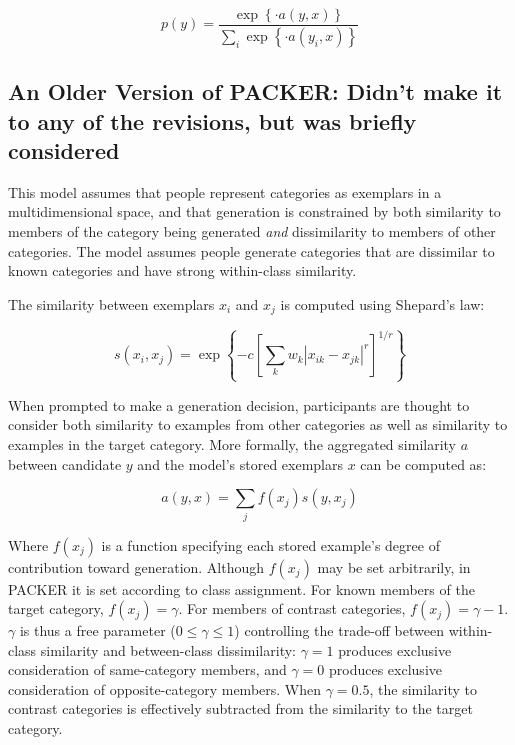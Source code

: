 \documentclass[12pt]{article} \usepackage[letterpaper, margin=1in,
\begin{document}
\begin{equation} p(y) = \dfrac { \exp \left \{ \cdot a \left( y, x
\right) \right \} } { \sum_i{ \exp \left \{  \cdot a \left( y_i, x \right)
\right\} } }
\label{eq:packer-choice}
\end{equation}




\subsection{An Older Version of PACKER: Didn't make it to any of the revisions, but was briefly considered}
This model assumes that people represent categories as exemplars in a
multidimensional space, and that generation is constrained by both similarity to
members of the category being generated \textit{and} dissimilarity to members of
other categories. The model assumes people generate categories that are
dissimilar to known categories and have strong within-class similarity.

The similarity between exemplars $x_i$ and $x_j$ is computed using Shepard's
law:

\begin{equation} s\left(x_i,x_j\right) = \exp \left\{ -c \left[\sum_{k}{ w_k
\left| x_{ik} - x_{jk} \right|^r }\right]^{1/r} \right\}
\label{eq:similarity}
\end{equation}

When prompted to make a generation decision, participants are thought to
consider both similarity to examples from other categories as well as similarity
to examples in the target category. More formally, the aggregated similarity $a$
between candidate $y$ and the model's stored exemplars $x$ can be computed as:

\begin{equation} a(y, x) = \sum_j{f(x_j) s(y, x_j)}
\end{equation}

Where $f(x_j)$ is a function specifying each stored example's degree of
contribution toward generation. Although $f(x_j)$ may be set arbitrarily, in
PACKER it is set according to class assignment. For known members of the target
category, $f(x_j) = \gamma$. For members of contrast categories, $f(x_j) =
\gamma - 1$. $\gamma$ is thus a free parameter ($0 \leq \gamma \leq 1$)
controlling the trade-off between within-class similarity and between-class
dissimilarity: $\gamma = 1$ produces exclusive consideration of same-category
members, and $\gamma = 0$ produces exclusive consideration of opposite-category
members. When $\gamma = 0.5$, the similarity to contrast categories is
effectively subtracted from the similarity to the target category.
\end{document}
